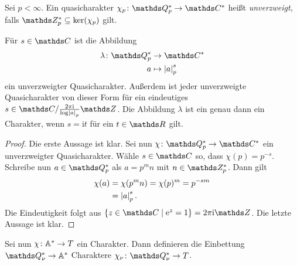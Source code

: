 \begin{defi}
Sei $p<\infty$. Ein quasicharakter $\chi_p \colon \Q_p^\ast \to \C^\ast$ heißt \emph{unverzweigt}, falls $\Z_p^\ast \subseteq \ker(\chi_p)$ gilt.
\end{defi}

\begin{prop}
Für $s\in \C$ ist die Abbildung
\begin{align*}
\lambda \colon \Q_p^\ast &\to \C^\ast\\
a&\mapsto \abs{a}_p^s
\end{align*}
ein unverzweigter Quasicharakter.
Außerdem ist jeder unverzweigte Quasicharakter von dieser Form für ein eindeutiges $s\in \C/\frac{2\pi \mathrm{i}}{\log \abs{a}_p}\Z$.
Die Abbildung $\lambda$ ist ein genau dann ein Charakter, wenn $s=\mathrm{i}t$ für ein $t\in \R$ gilt.
\end{prop}
\begin{proof}
Die erste Aussage ist klar.
Sei nun $\chi\colon \Q_p^\ast \to \C^\ast$ ein unverzweigter Quasicharakter.
Wähle $s\in \C$ so, dass $\chi(p)=p^{-s}$.
Schreibe nun $a\in \Q_p^\ast$ als $a=p^m n$ mit $n \in \Z_p^\ast$. Dann gilt
\begin{align*}
\chi(a)&=\chi(p^mn)=\chi(p)^m=p^{-sm}\\
&=\left\vert a\right\vert_p^s.
\end{align*}
Die Eindeutigkeit folgt aus $\{z \in \C \mid \ex^z=1\}=2\pi \mathrm{i}\Z$.
Die letzte Aussage ist klar.
\end{proof}

Sei nun $\chi \colon \mathbb{A}^\ast \to T$ ein Charakter.
Dann definieren die Einbettung $\Q_\nu^\ast \to \A^\ast$ Charaktere $\chi_\nu \colon \Q_\nu^\ast\to T$.

